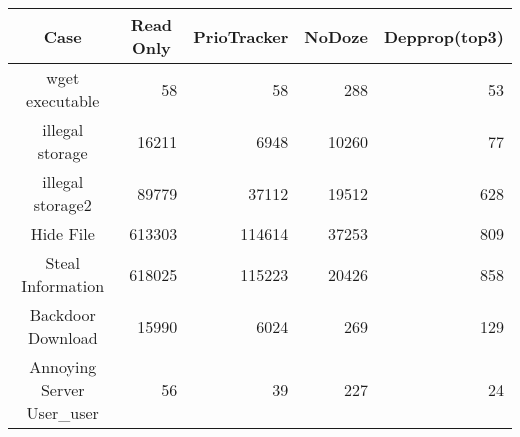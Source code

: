 \begin{tabular}{crrrr}
\hline
\rowcolor[HTML]{C0C0C0} 
\textbf{Case}              & \multicolumn{1}{c}{\cellcolor[HTML]{C0C0C0}\textbf{Read Only}} & \multicolumn{1}{c}{\cellcolor[HTML]{C0C0C0}\textbf{PrioTracker}} & \multicolumn{1}{c}{\cellcolor[HTML]{C0C0C0}\textbf{NoDoze}} & \multicolumn{1}{c}{\cellcolor[HTML]{C0C0C0}\textbf{Depprop(top3)}} \\ \hline
wget executable            & 58                                                             & 58                                                               & 288                                                         & 53                                                                 \\ \hline
\rowcolor[HTML]{C0C0C0} 
illegal storage            & 16211                                                          & 6948                                                             & 10260                                                       & 77                                                                 \\ \hline
illegal storage2           & 89779                                                          & 37112                                                            & 19512                                                       & 628                                                                \\ \hline
\rowcolor[HTML]{C0C0C0} 
Hide File                  & 613303                                                         & 114614                                                           & 37253                                                       & 809                                                                \\ \hline
Steal Information          & 618025                                                         & 115223                                                           & 20426                                                       & 858                                                                \\ \hline
\rowcolor[HTML]{C0C0C0} 
Backdoor Download          & 15990                                                          & 6024                                                             & 269                                                         & 129                                                                \\ \hline
Annoying Server User\_user & 56                                                             & 39                                                               & 227                                                         & 24                                                                 \\ \hline

\end{tabular}
